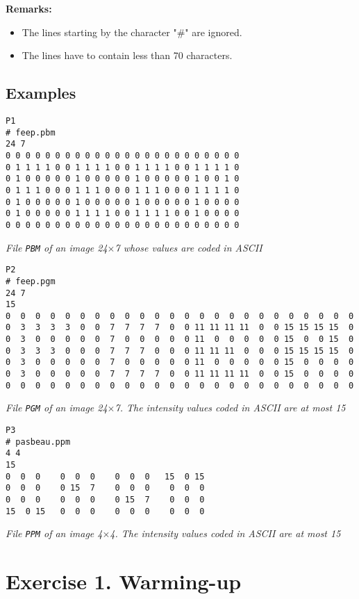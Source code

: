 \documentclass[a4paper, 11pt, english]{article}
\begin{document}
\noindent \textbf{Remarks:}
\begin{itemize}
	\item The lines starting by the character "\#" are ignored.
	\item The lines have to contain less than 70 characters.
\end{itemize}


\subsection*{Examples}

\begin{verbatim}
P1
# feep.pbm
24 7
0 0 0 0 0 0 0 0 0 0 0 0 0 0 0 0 0 0 0 0 0 0 0 0
0 1 1 1 1 0 0 1 1 1 1 0 0 1 1 1 1 0 0 1 1 1 1 0
0 1 0 0 0 0 0 1 0 0 0 0 0 1 0 0 0 0 0 1 0 0 1 0
0 1 1 1 0 0 0 1 1 1 0 0 0 1 1 1 0 0 0 1 1 1 1 0
0 1 0 0 0 0 0 1 0 0 0 0 0 1 0 0 0 0 0 1 0 0 0 0
0 1 0 0 0 0 0 1 1 1 1 0 0 1 1 1 1 0 0 1 0 0 0 0
0 0 0 0 0 0 0 0 0 0 0 0 0 0 0 0 0 0 0 0 0 0 0 0
\end{verbatim}
{\it File \texttt{PBM} of an image  24$\times$7 whose values are coded in ASCII}
\begin{verbatim}
P2
# feep.pgm
24 7
15
0  0  0  0  0  0  0  0  0  0  0  0  0  0  0  0  0  0  0  0  0  0  0  0
0  3  3  3  3  0  0  7  7  7  7  0  0 11 11 11 11  0  0 15 15 15 15  0
0  3  0  0  0  0  0  7  0  0  0  0  0 11  0  0  0  0  0 15  0  0 15  0
0  3  3  3  0  0  0  7  7  7  0  0  0 11 11 11  0  0  0 15 15 15 15  0
0  3  0  0  0  0  0  7  0  0  0  0  0 11  0  0  0  0  0 15  0  0  0  0
0  3  0  0  0  0  0  7  7  7  7  0  0 11 11 11 11  0  0 15  0  0  0  0
0  0  0  0  0  0  0  0  0  0  0  0  0  0  0  0  0  0  0  0  0  0  0  0
\end{verbatim}
{\it File \texttt{PGM} of an image  24$\times$7. The intensity values coded in ASCII are at most 15}
\begin{verbatim} 
P3
# pasbeau.ppm
4 4
15
0  0  0    0  0  0    0  0  0   15  0 15
0  0  0    0 15  7    0  0  0    0  0  0
0  0  0    0  0  0    0 15  7    0  0  0
15  0 15   0  0  0    0  0  0    0  0  0
\end{verbatim}
{\it File \texttt{PPM} of an image 4$\times$4. The intensity values coded in ASCII are at most 15}


\newpage
\section*{\bf Exercise 1. \rm Warming-up}
\end{document}
